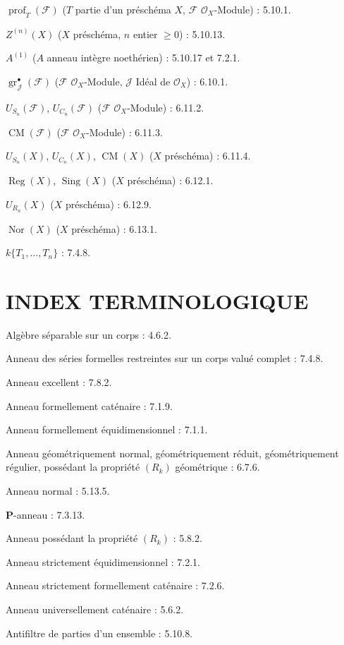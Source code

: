 $\operatorname{prof}_T(\mathscr F)$ ($T$ partie d'un préschéma $X$, $\mathscr F$
$\mathcal O_X$-Module) : 5.10.1.

$Z^{(n)}(X)$ ($X$ préschéma, $n$ entier $\geq0$) : 5.10.13.

$A^{(1)}$ ($A$ anneau intègre noethérien) : 5.10.17 et 7.2.1.

$\operatorname{gr}_{\mathscr J}^{\bullet}(\mathscr F)$ ($\mathscr F$
$\mathcal O_X$-Module, $\mathscr J$ Idéal de $\mathcal O_X$) : 6.10.1.

$U_{S_n}(\mathscr F)$, $U_{C_n}(\mathscr F)$ ($\mathscr F$
$\mathcal O_X$-Module) : 6.11.2.

$\operatorname{CM}(\mathscr F)$ ($\mathscr F$ $\mathcal O_X$-Module) : 6.11.3.

$U_{S_n}(X)$, $U_{C_n}(X)$, $\operatorname{CM}(X)$ ($X$ préschéma) : 6.11.4.

$\operatorname{Reg}(X)$, $\operatorname{Sing}(X)$ ($X$ préschéma) : 6.12.1.

$U_{R_n}(X)$ ($X$ préschéma) : 6.12.9.

$\operatorname{Nor}(X)$ ($X$ préschéma) : 6.13.1.

$k\{T_1,\ldots,T_n\}$ : 7.4.8.

\endgroup

\clearpage
{}
{}
\section*{INDEX TERMINOLOGIQUE}

\begingroup
\footnotesize
\setlength{\parindent}{0pt}
\setlength{\parskip}{1.1pt}
\newcommand{\EGAIVtwoTerm}[2]{#1 : #2.\par}

\EGAIVtwoTerm{Algèbre séparable sur un corps}{4.6.2}
\EGAIVtwoTerm{Anneau des séries formelles restreintes sur un corps valué complet}{7.4.8}
\EGAIVtwoTerm{Anneau excellent}{7.8.2}
\EGAIVtwoTerm{Anneau formellement caténaire}{7.1.9}
\EGAIVtwoTerm{Anneau formellement équidimensionnel}{7.1.1}
\EGAIVtwoTerm{Anneau géométriquement normal, géométriquement réduit,
géométriquement régulier, possédant la propriété $(R_k)$ géométrique}{6.7.6}
\EGAIVtwoTerm{Anneau normal}{5.13.5}
\EGAIVtwoTerm{$\boldsymbol P$-anneau}{7.3.13}
\EGAIVtwoTerm{Anneau possédant la propriété $(R_k)$}{5.8.2}
\EGAIVtwoTerm{Anneau strictement équidimensionnel}{7.2.1}
\EGAIVtwoTerm{Anneau strictement formellement caténaire}{7.2.6}
\EGAIVtwoTerm{Anneau universellement caténaire}{5.6.2}
\EGAIVtwoTerm{Antifiltre de parties d'un ensemble}{5.10.8}

